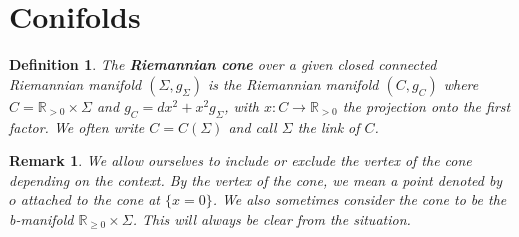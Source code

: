 \documentclass[a4paper,11pt]{article}
\newcounter{mythm}[section]
\newtheorem{defi}[mythm]{Definition}
\newtheorem{rem}[mythm]{Remark}
\def\R{\mathbb{R}}
\begin{document}
\section{Conifolds} \label{conifolds}
\begin{defi} \label{conical}
The \textbf{Riemannian cone} over a given closed connected Riemannian manifold $\left(\Sigma, g_\Sigma\right)$ is the Riemannian manifold $\left(C, g_C\right)$ where $C=\mathbb{R}_{>0} \times \Sigma$ and $g_C=d x^2+x^2 g_\Sigma$, with $x: C \rightarrow \mathbb{R}_{>0}$ the projection onto the first factor. We often write $C=C(\Sigma)$ and call $\Sigma$ the link of $C$.
\end{defi}
\begin{rem}
    We allow ourselves to include or exclude the vertex of the cone depending on the context. By the \emph{vertex} of the cone, we mean a point denoted by $o$ attached to the cone at $\{x=0\}$. We also sometimes consider the cone to be the b-manifold $\R_{\geq 0} \times \Sigma$. This will always be clear from the situation.
\end{rem}
\end{document}
